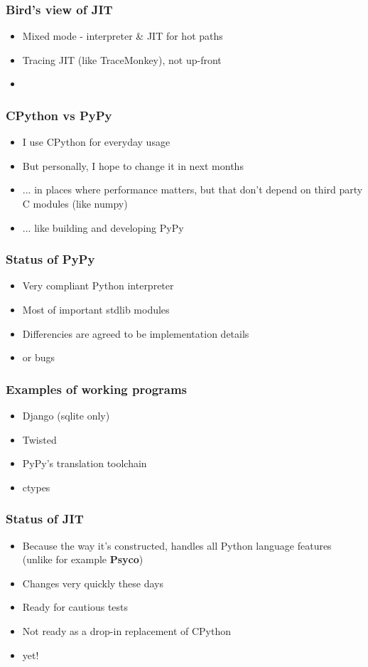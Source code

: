 \documentclass[utf8x]{beamer}
\begin{document}
\begin{frame}
  \frametitle{Bird's view of JIT}
  \begin{itemize}
    \item Mixed mode - interpreter \& JIT for hot paths
    \item Tracing JIT (like TraceMonkey), not up-front
    \item 
  \end{itemize}
\end{frame}

\begin{frame}
  \frametitle{CPython vs PyPy}
  \begin{itemize}
    \item I use CPython for everyday usage
      \pause
    \item But personally, I hope to change it in next months
      \pause
    \item ... in places where performance matters, but that don't
      depend on third party C modules (like numpy)
      \pause
    \item ... like building and developing PyPy
  \end{itemize}
\end{frame}

\begin{frame}
  \frametitle{Status of PyPy}
  \begin{itemize}
    \item Very compliant Python interpreter
    \item Most of important stdlib modules
    \item Differencies are agreed to be implementation details
      \pause
    \item {\color{red} or bugs}
  \end{itemize}
\end{frame}

\begin{frame}
  \frametitle{Examples of working programs}
  \begin{itemize}
    \item Django (sqlite only)
    \item Twisted
    \item PyPy's translation toolchain
    \item ctypes
  \end{itemize}
\end{frame}

\begin{frame}
  \frametitle{Status of JIT}
  \begin{itemize}
    \item Because the way it's constructed, handles all Python language
      features (unlike for example {\bf Psyco})
    \item Changes very quickly these days
    \item Ready for cautious tests
    \item Not ready as a drop-in replacement of CPython
      \pause
    \item {\color{green} yet!}
  \end{itemize}
\end{frame}
\end{document}
